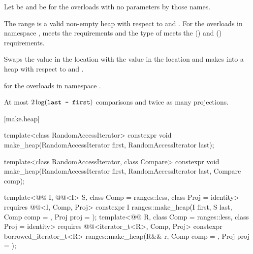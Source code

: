 \begin{itemdescr}
\pnum
Let  be 
and  be 
for the overloads with no parameters by those names.

\pnum
\expects
The range 
is a valid non-empty heap with respect to  and .
For the overloads in namespace ,
 meets
the  requirements and
the type of  meets
the  () and
 () requirements.

\pnum
\effects
Swaps the value in the location 
with the value in the location
and makes
into a heap with respect to  and .

\pnum
\returns
{} for the overloads in namespace .

\pnum
\complexity
At most $2 \log(\tcode{last - first})$ comparisons and
twice as many projections.
\end{itemdescr}

[make.heap]{}

%
\begin{itemdecl}
template<class RandomAccessIterator>
  constexpr void make_heap(RandomAccessIterator first, RandomAccessIterator last);

template<class RandomAccessIterator, class Compare>
  constexpr void make_heap(RandomAccessIterator first, RandomAccessIterator last,
                           Compare comp);

template<@@ I, @@<I> S, class Comp = ranges::less,
         class Proj = identity>
  requires @@<I, Comp, Proj>
  constexpr I
    ranges::make_heap(I first, S last, Comp comp = {}, Proj proj = {});
template<@@ R, class Comp = ranges::less, class Proj = identity>
  requires @@<iterator_t<R>, Comp, Proj>
  constexpr borrowed_iterator_t<R>
    ranges::make_heap(R&& r, Comp comp = {}, Proj proj = {});
\end{itemdecl}


